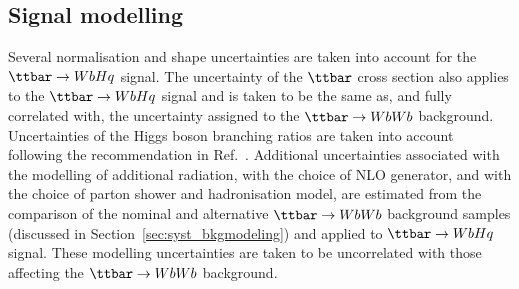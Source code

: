 \subsection{Signal modelling}
\label{sec:syst_sigmodeling}

Several normalisation and shape uncertainties are taken into account for the $\Hq$ signal.
The uncertainty of the $\ttbar$ cross section also applies to the $\Hq$ signal and is taken to be the same as, 
and fully correlated with, the uncertainty assigned to the $\ttbar \to WbWb$ background.
Uncertainties of the Higgs boson branching ratios are taken into account
following the recommendation in Ref.~\cite{deFlorian:2016spz}.
Additional uncertainties associated with the modelling of additional radiation, with the choice of NLO generator, and
with the choice of parton shower and hadronisation model, are estimated from the comparison of the nominal
and alternative $\ttbar \to WbWb$ background samples (discussed in Section~\ref{sec:syst_bkgmodeling}) and applied to $\Hq$ signal. 
These modelling uncertainties are taken to be uncorrelated with those affecting the $\ttbar \to WbWb$ background.
